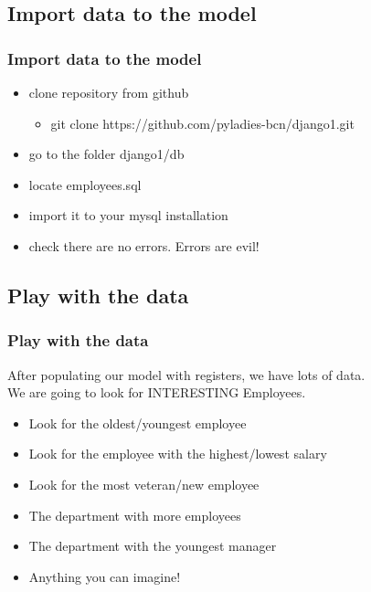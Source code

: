 	\subsection{Import data to the model}
	\begin{frame}
		\frametitle{Import data to the model}
		\begin{itemize}[<+->]
			\item clone repository from github
			\begin{itemize}
				\item git clone https://github.com/pyladies-bcn/django1.git
			\end{itemize}
			\item go to the folder django1/db
			\item locate employees.sql
			\item import it to your mysql installation
			\item check there are no errors. Errors are evil!
		\end{itemize}
	\end{frame}

	\subsection{Play with the data}
	\begin{frame}
		\frametitle{Play with the data}
		After populating our model with registers, we have lots of data. \\ \pause
		We are going to look for  INTERESTING  Employees.
		\begin{itemize}[<+->]
			\item Look for the oldest/youngest employee
			\item Look for the employee with the highest/lowest salary
			\item Look for the most veteran/new employee
			\item The department with more employees
			\item The department with the youngest manager
			\item Anything you can imagine!
		\end{itemize}
	\end{frame}

\ThankYouFrame

